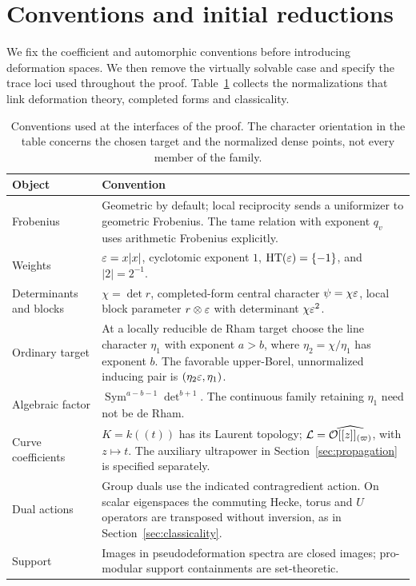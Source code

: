 \section{Conventions and initial reductions}\label{sec:preliminaries}

We fix the coefficient and automorphic conventions before
introducing deformation spaces. We then remove the virtually
solvable case and specify the trace loci used throughout the
proof. Table~\ref{tab:conventions} collects the normalizations that
link deformation theory, completed forms and classicality.

\begin{table}[htbp]
\centering\small
\renewcommand{\arraystretch}{1.2}
\begin{tabular}{@{}p{}p{}@{}}
\toprule
Object & Convention \\
\midrule
Frobenius & Geometric by default; local reciprocity sends a uniformizer
to geometric Frobenius. The tame relation with exponent \(q_v\)
uses arithmetic Frobenius explicitly. \\
Weights & \(\varepsilon=x|x|\), cyclotomic exponent \(1\),
\(\operatorname{HT}(\varepsilon)=\{-1\}\), and \(|2|=2^{-1}\). \\
Determinants and blocks & \(\chi=\det r\), completed-form central
character \(\psi=\chi\varepsilon\), local block parameter \(r\otimes\varepsilon\)
with determinant \(\chi\varepsilon^2\). \\
Ordinary target & At a locally reducible de Rham target choose the line character
\(\eta_1\) with exponent \(a>b\), where
\(\eta_2=\chi/\eta_1\) has exponent \(b\). The favorable upper-Borel,
unnormalized inducing pair is \((\eta_2\varepsilon,\eta_1)\). \\
Algebraic factor & \(\operatorname{Sym}^{a-b-1}\det^{b+1}\).
The continuous family retaining \(\eta_1\) need not be de Rham. \\
Curve coefficients & \(K=k((t))\) has its Laurent topology;
\(\mathcal L=\widehat{\mathcal O[[z]]_{(\varpi)}}\), with \(z\mapsto t\).
The auxiliary ultrapower in Section~\ref{sec:propagation} is specified
separately. \\
Dual actions & Group duals use the indicated contragredient action.
On scalar eigenspaces the commuting Hecke, torus and \(U\) operators
are transposed without inversion, as in Section~\ref{sec:classicality}. \\
Support & Images in pseudodeformation spectra are closed images;
pro-modular support containments are set-theoretic. \\
\bottomrule
\end{tabular}
\caption{Conventions used at the interfaces of the proof. The
character orientation in the table concerns the chosen target and
the normalized dense points, not every member of the family.}
\label{tab:conventions}
\end{table}


